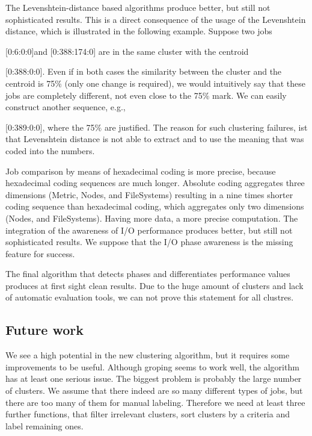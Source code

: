 \documentclass[]{llncs}
\begin{document}
{{{{The Levenshtein-distance based algorithms produce better, but still not sophisticated results.
This is a direct consequence of the usage of the Levenshtein distance, which is illustrated in the following example.
Suppose two jobs {[0:6:0:0]and [0:388:174:0] are in the same cluster with the centroid {[0:388:0:0].
Even if in both cases the similarity between the cluster and the centroid is 75$\%$  (only one change is required), we would intuitively say that these jobs are completely different, not even close to the 75$\%$  mark.
We can easily construct another sequence, e.g., {[0:389:0:0], where the 75$\%$  are justified.
The reason for such clustering failures, ist that Levenshtein distance is not able to extract and to use the meaning that was coded into the numbers.

Job comparison by means of hexadecimal coding is more precise, because hexadecimal coding sequences are much longer.
Absolute coding aggregates three dimensions (Metric, Nodes, and FileSystems) resulting in a nine times shorter coding sequence than hexadecimal coding, which aggregates only two dimensions (Nodes, and FileSystems).
Having more data, a more precise computation.
The integration of the awareness of I/O performance produces better, but still not sophisticated results.
We suppose that the I/O phase awareness is the missing feature for success.

The final algorithm that detects phases and differentiates performance values produces at first sight clean results.
Due to the huge amount of clusters and lack of automatic evaluation tools, we can not prove this statement for all clustres.

\subsection{Future work}
We see a high potential in the new clustering algorithm, but it requires some improvements to be useful.
Although groping seems to work well, the algorithm has at least one serious issue.
The biggest problem is probably the large number of clusters.
We assume that there indeed are so many different types of jobs, but there are too many of them for manual labeling.
Therefore we need at least three further functions, that filter irrelevant clusters, sort clusters by a criteria and label remaining ones.




}}}}}}}
\end{document}
